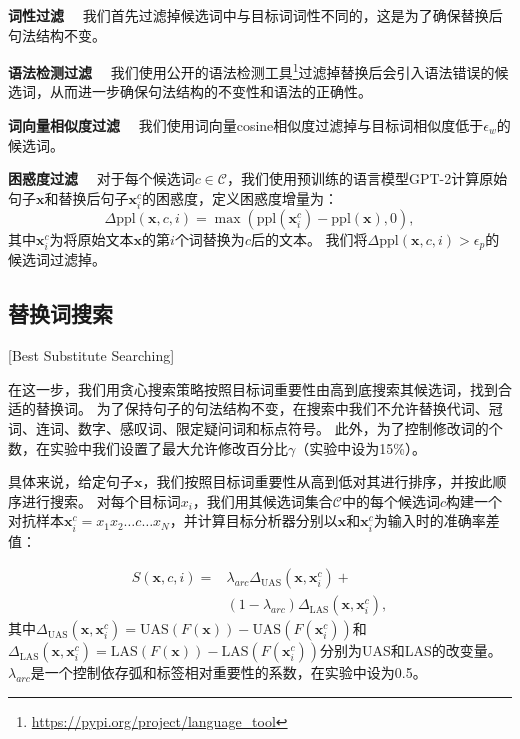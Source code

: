 \textbf{词性过滤} \ \ 我们首先过滤掉候选词中与目标词词性不同的，这是为了确保替换后句法结构不变。

\textbf{语法检测过滤} \ \ 我们使用公开的语法检测工具\footnote{\url{https://pypi.org/project/language_tool}}过滤掉替换后会引入语法错误的候选词，从而进一步确保句法结构的不变性和语法的正确性。


\textbf{词向量相似度过滤} \ \ 我们使用词向量cosine相似度过滤掉与目标词相似度低于$\epsilon_w$的候选词。

\textbf{困惑度过滤} \ \ 对于每个候选词$c \in \mathcal{C}$，我们使用预训练的语言模型GPT-2计算原始句子$\mathbf{x}$和替换后句子$\mathbf{x}^c_{i}$的困惑度，定义困惑度增量为：
\begin{equation}
	\label{eq:ppl-inc}
	\Delta \text{ppl}(\mathbf{x},c,i)=\max(\text{ppl}(\mathbf{x}^c_{i})-\text{ppl}(\mathbf{x}), 0),
\end{equation}
其中$\mathbf{x}^c_{i}$为将原始文本$\mathbf{x}$的第$i$个词替换为$c$后的文本。
我们将$\Delta\text{ppl}(\mathbf{x},c,i) > \epsilon_p$的候选词过滤掉。


\subsection{替换词搜索}[Best Substitute Searching]

在这一步，我们用贪心搜索策略按照目标词重要性由高到底搜索其候选词，找到合适的替换词。
为了保持句子的句法结构不变，在搜索中我们不允许替换代词、冠词、连词、数字、感叹词、限定疑问词和标点符号。
此外，为了控制修改词的个数，在实验中我们设置了最大允许修改百分比$\gamma$（实验中设为15\%）。

具体来说，给定句子$\mathbf{x}$，我们按照目标词重要性从高到低对其进行排序，并按此顺序进行搜索。
对每个目标词$x_i$，我们用其候选词集合$\mathcal{C}$中的每个候选词$c$构建一个对抗样本$\mathbf{x}^c_{i} = x_1x_2\dots c\dots x_N$，并计算目标分析器分别以$\mathbf{x}$和$\mathbf{x}^c_{i}$为输入时的准确率差值：

\begin{equation}
	\begin{aligned}
		\label{eq:mis-inc}
		S(\mathbf{x},c,i) = & \lambda_{arc}\Delta_\text{UAS}(\mathbf{x},\mathbf{x}^c_{i}) + \\ 
		& (1-\lambda_{arc})\Delta_\text{LAS}(\mathbf{x},\mathbf{x}^c_{i}),
	\end{aligned}
\end{equation}
其中$\Delta_\text{UAS}(\mathbf{x},\mathbf{x}^c_{i}) = \text{UAS}(F(\mathbf{x})) - \text{UAS}(F(\mathbf{x}^c_{i})) $和$\Delta_\text{LAS}(\mathbf{x},\mathbf{x}^c_{i}) = \text{LAS}(F(\mathbf{x})) - \text{LAS}(F(\mathbf{x}^c_{i}))$分别为UAS和LAS的改变量。 
$\lambda_{arc}$是一个控制依存弧和标签相对重要性的系数，在实验中设为0.5。

